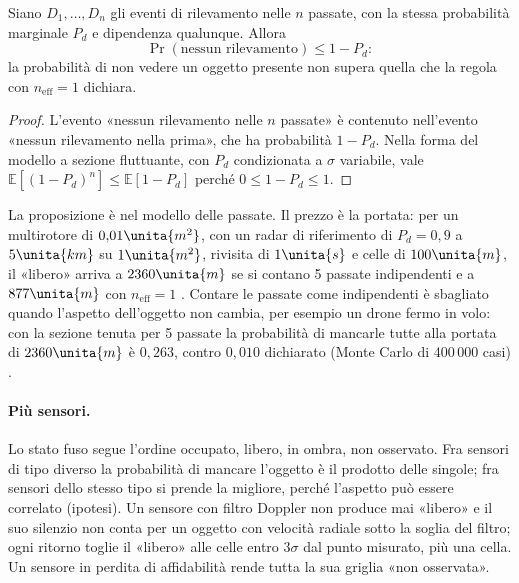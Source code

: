 \begin{proposizione}[La regola con $n_{\mathrm{eff}}=1$ è prudente per ogni correlazione]\label{prop:lp-correlate}
Siano $D_1,\dots,D_n$ gli eventi di rilevamento nelle $n$ passate, con la stessa probabilità marginale $P_d$ e dipendenza qualunque. Allora
\[\Pr(\text{nessun rilevamento})\le 1-P_d :\]
la probabilità di non vedere un oggetto presente non supera quella che la regola con $n_{\mathrm{eff}}=1$ dichiara.
\end{proposizione}
\begin{proof}
L'evento «nessun rilevamento nelle $n$ passate» è contenuto nell'evento «nessun rilevamento nella prima», che ha probabilità $1-P_d$. Nella forma del modello a sezione fluttuante, con $P_d$ condizionata a $\sigma$ variabile, vale $\mathbb{E}[(1-P_d)^n]\le\mathbb{E}[1-P_d]$ perché $0\le1-P_d\le1$.
\end{proof}
La proposizione è  nel modello delle passate. Il prezzo è la portata: per un multirotore di $0{,}01\unita{m^2}$, con un radar di riferimento di $P_d=0{,}9$ a $5\unita{km}$ su $1\unita{m^2}$, rivisita di $1\unita{s}$ e celle di $100\unita{m}$, il «libero» arriva a $2360\unita{m}$ se si contano 5 passate indipendenti e a $877\unita{m}$ con $n_{\mathrm{eff}}=1$ . Contare le passate come indipendenti è sbagliato quando l'aspetto dell'oggetto non cambia, per esempio un drone fermo in volo: con la sezione tenuta per 5 passate la probabilità di mancarle tutte alla portata di $2360\unita{m}$ è $0{,}263$, contro $0{,}010$ dichiarato (Monte Carlo di $400\,000$ casi) .

\paragraph{Più sensori.} Lo stato fuso segue l'ordine occupato, libero, in ombra, non osservato. Fra sensori di tipo diverso la probabilità di mancare l'oggetto è il prodotto delle singole; fra sensori dello stesso tipo si prende la migliore, perché l'aspetto può essere correlato (ipotesi). Un sensore con filtro Doppler non produce mai «libero» e il suo silenzio non conta per un oggetto con velocità radiale sotto la soglia del filtro; ogni ritorno toglie il «libero» alle celle entro $3\sigma$ dal punto misurato, più una cella. Un sensore in perdita di affidabilità rende tutta la sua griglia «non osservata».


